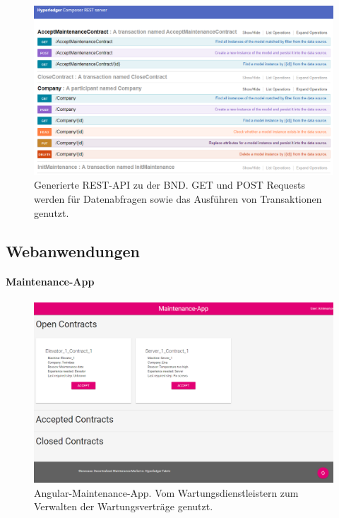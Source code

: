 \begin{figure}[!htbp]
    \centering
      \includegraphics[width=1.0\textwidth,angle=0]{images/rest-api}
       \caption{Generierte REST-API zu der \acs{BND}. GET und POST Requests werden für Datenabfragen sowie das Ausführen von Transaktionen genutzt.}
      \label{fig:rest-api}
\end{figure}

\subsection{Webanwendungen}

\paragraph{Maintenance-App}

\begin{figure}[!htbp]
    \centering
      \includegraphics[width=1.0\textwidth,angle=0]{images/maintenance-app}
       \caption{Angular-Maintenance-App. Vom Wartungsdienstleistern zum Verwalten der Wartungsverträge genutzt.}
      \label{fig:maintenance-app}
\end{figure}

